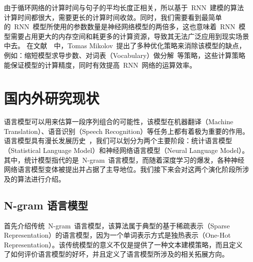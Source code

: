 由于循环网络的计算时间与句子的平均长度正相关，所以基于~RNN~建模的算法计算时间都很大，需要更长的计算时间收敛。同时，我们需要看到最简单的~RNN~模型所使用的参数数量是神经网络模型的两倍多，这也意味着~RNN~模型需要占用更大的内存空间和耗更多的计算资源，导致其无法广泛应用到现实场景中去。
在文献~\cite{DBLP:conf/icassp/MikolovKBCK11}~中，Tomas Mikolov~提出了多种优化策略来消除该模型的缺点，例如：缩短模型求导步数、对词表（Vocabulary）做分解~等策略，这些计算策略能保证模型的计算精度，同时有效提高~RNN~网络的运算效率。

\section{国内外研究现状}
语言模型可以用来估算一段序列组合的可能性，该模型在机器翻译（Machine Translation）、语音识别（Speech Recognition）等任务上都有着极为重要的作用。语言模型具有漫长发展历史~，我们可以划分为两个主要阶段：统计语言模型（Statistical Language Model）和神经网络语言模型（Neural Language Model）。
其中，统计模型指代的是~N-gram~语言模型，而随着深度学习的爆发，各种神经网络语言模型变体被提出并占据了主导地位。我们接下来会对这两个演化阶段所涉及的算法进行介绍。

\subsection{N-gram 语言模型}
首先介绍传统~N-gram~语言模型，该算法属于典型的基于稀疏表示（Sparse Representation）的语言模型，因为一个单词表示方式是独热表示（One-Hot Representation）。该传统模型的意义不仅是提供了一种文本建模策略，而且定义了如何评价语言模型的好坏，并且定义了语言模型所涉及的相关拓展方向。

